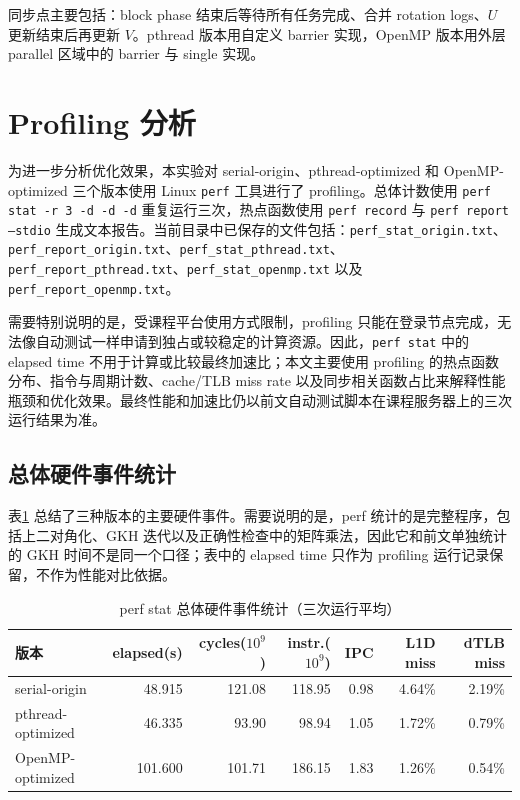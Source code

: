 ﻿\documentclass[UTF8,a4paper]{ctexart}
\begin{document}
同步点主要包括：block phase 结束后等待所有任务完成、合并 rotation logs、$U$ 更新结束后再更新 $V$。pthread 版本用自定义 barrier 实现，OpenMP 版本用外层 parallel 区域中的 barrier 与 single 实现。

\section{Profiling 分析}

为进一步分析优化效果，本实验对 serial-origin、pthread-optimized 和 OpenMP-optimized 三个版本使用 Linux \texttt{perf} 工具进行了 profiling。总体计数使用 \texttt{perf stat -r 3 -d -d -d} 重复运行三次，热点函数使用 \texttt{perf record} 与 \texttt{perf report --stdio} 生成文本报告。当前目录中已保存的文件包括：\texttt{perf\_stat\_origin.txt}、\texttt{perf\_report\_origin.txt}、\texttt{perf\_stat\_pthread.txt}、\texttt{perf\_report\_pthread.txt}、\texttt{perf\_stat\_openmp.txt} 以及 \texttt{perf\_report\_openmp.txt}。

需要特别说明的是，受课程平台使用方式限制，profiling 只能在登录节点完成，无法像自动测试一样申请到独占或较稳定的计算资源。因此，\texttt{perf stat} 中的 elapsed time 不用于计算或比较最终加速比；本文主要使用 profiling 的热点函数分布、指令与周期计数、cache/TLB miss rate 以及同步相关函数占比来解释性能瓶颈和优化效果。最终性能和加速比仍以前文自动测试脚本在课程服务器上的三次运行结果为准。

\subsection{总体硬件事件统计}

表\ref{tab:perf_stat} 总结了三种版本的主要硬件事件。需要说明的是，perf 统计的是完整程序，包括上二对角化、GKH 迭代以及正确性检查中的矩阵乘法，因此它和前文单独统计的 GKH 时间不是同一个口径；表中的 elapsed time 只作为 profiling 运行记录保留，不作为性能对比依据。

\begin{table}[H]
\centering
\caption{perf stat 总体硬件事件统计（三次运行平均）}
\label{tab:perf_stat}
\begin{tabular}{lrrrrrr}
\toprule
版本 & elapsed(s) & cycles($10^9$) & instr.($10^9$) & IPC & L1D miss & dTLB miss \\
\midrule
serial-origin & 48.915 & 121.08 & 118.95 & 0.98 & 4.64\% & 2.19\% \\
pthread-optimized & 46.335 & 93.90 & 98.94 & 1.05 & 1.72\% & 0.79\% \\
OpenMP-optimized & 101.600 & 101.71 & 186.15 & 1.83 & 1.26\% & 0.54\% \\
\bottomrule
\end{tabular}
\end{table}
\end{document}
